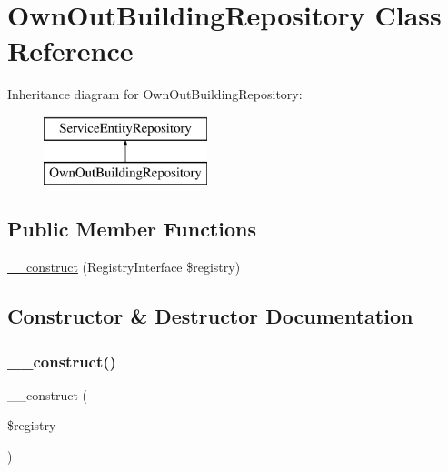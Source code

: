 \hypertarget{class_app_1_1_repository_1_1_own_out_building_repository}{}\section{Own\+Out\+Building\+Repository Class Reference}
\label{class_app_1_1_repository_1_1_own_out_building_repository}
Inheritance diagram for Own\+Out\+Building\+Repository\+:\begin{figure}[H]
\begin{center}
\leavevmode
\includegraphics[height=2.000000cm]{class_app_1_1_repository_1_1_own_out_building_repository}
\end{center}
\end{figure}
\subsection*{Public Member Functions}
\begin{DoxyCompactItemize}
\item 
\mbox{\hyperlink{class_app_1_1_repository_1_1_own_out_building_repository_aadca7edd263e228921a1860bb6b9c252}{\+\_\+\+\_\+construct}} (Registry\+Interface \$registry)
\end{DoxyCompactItemize}


\subsection{Constructor \& Destructor Documentation}
\mbox{\label{class_app_1_1_repository_1_1_own_out_building_repository_aadca7edd263e228921a1860bb6b9c252}} 
\subsubsection{\texorpdfstring{\_\_construct()}{\_\_construct()}}
{\footnotesize\ttfamily \+\_\+\+\_\+construct (\begin{DoxyParamCaption}\item[{Registry\+Interface}]{\$registry }\end{DoxyParamCaption})}

